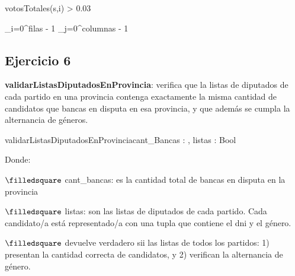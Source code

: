 \documentclass[10pt,a4paper]{article}
\begin{document}
\vspace{0.3cm}
{votosTotales(s,i) > 0.03}

\vspace{0.3cm}
{}

\vspace{0.3cm}
{
	\newline
	\sum_{i=0}^{filas - 1} \sum_{j=0}^{columnas - 1}  }

\pagebreak







\subsection{Ejercicio 6} 

\textbf{validarListasDiputadosEnProvincia}: verifica que la listas de diputados de cada partido en una provincia contenga
exactamente la misma cantidad de candidatos que bancas en disputa en esa provincia, y que además se cumpla la
alternancia de géneros.

\begin{proc}{validarListasDiputadosEnProvincia}{\In cant\_Bancas : \ent, \In listas : }{Bool}
\end{proc}

Donde:

\quad $\filledsquare$ cant\_bancas: es la cantidad total de bancas en disputa en la provincia

\quad $\filledsquare$ listas: son las listas de diputados de cada partido. Cada candidato/a está representado/a con una tupla que contiene el dni y el género.

\quad $\filledsquare$ devuelve verdadero sii las listas de todos los partidos: 1) presentan la cantidad correcta de candidatos, y 2) verifican
la alternancia de género.
\end{document}
